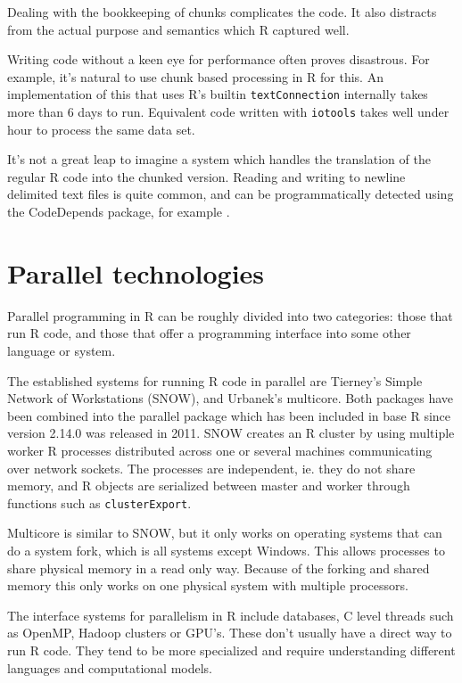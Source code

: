 \documentclass[12pt]{article}
\begin{document}
Dealing with the bookkeeping of chunks complicates the code.  It also
distracts from the actual purpose and semantics which R captured well.

Writing code without a keen eye for performance often proves disastrous.
For example, it's natural to use chunk based processing in R for this. An
implementation of this that uses R's builtin \texttt{textConnection}
internally takes more than 6 days to run. Equivalent code written with
\texttt{iotools} takes well under hour to process the same data set.

It's not a great leap to imagine a system which handles the translation
of the regular R code into the chunked version. Reading and writing
to newline delimited text files is quite common, and can be
programmatically detected using the CodeDepends package, for example
\cite{R-CodeDepends}.

\section{Parallel technologies}

Parallel programming in R can be roughly divided into two categories: those
that run R code, and those that offer a programming interface into some
other language or system. 

The established systems for running R code in parallel are Tierney's Simple
Network of Workstations (SNOW), and Urbanek's multicore. Both packages have
been combined into the parallel package which has been included in base R since
version 2.14.0 was released in 2011. SNOW creates
an R cluster by using multiple worker R processes distributed across one or
several machines communicating over network sockets. The processes are independent,
ie. they do not share memory, and R objects are serialized
between master and worker through functions such as \texttt{clusterExport}.

Multicore is similar to SNOW, but it only works on operating systems that can
do a system fork, which is all systems except Windows. This allows
processes to share physical memory in a read only way. Because of the
forking and shared memory this only works on one physical system with
multiple processors.

The interface systems for parallelism in R include databases, C level
threads such as OpenMP, Hadoop clusters or GPU's. These don't usually have
a direct way to run R code. They tend to be more specialized and require
understanding different languages and computational models.
\end{document}
